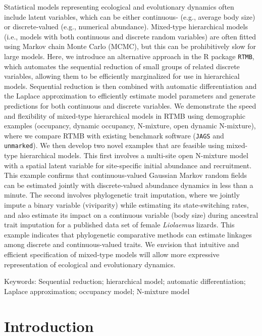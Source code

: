 \documentclass[11pt]{article}
\begin{document}
Statistical models representing ecological and evolutionary dynamics often include latent variables, which can be either continuous- (e.g., average body size) or discrete-valued (e.g., numerical abundance).  Mixed-type hierarchical models (i.e., models with both continuous and discrete random variables) are often fitted using Markov chain Monte Carlo (MCMC), but this can be prohibitively slow for large models.  Here, we introduce an alternative approach in the R package \texttt{RTMB}, which automates the sequential reduction of small groups of related discrete variables, allowing them to be efficiently marginalized for use in hierarchical models. Sequential reduction is then combined with automatic differentiation and the Laplace approximation to efficiently estimate model parameters and generate predictions for both continuous and discrete variables. We demonstrate the speed and flexibility of mixed-type hierarchical models in RTMB using demographic examples (occupancy, dynamic occupancy, N-mixture, open dynamic N-mixture), where we compare RTMB with existing  benchmark software (\texttt{JAGS} and \texttt{unmarked}).  We then develop two novel examples that are feasible using mixed-type hierarchical models.  This first involves a multi-site open N-mixture model with a spatial latent variable for site-specific initial abundance and recruitment.  This example confirms that continuous-valued Gaussian Markov random fields can be estimated jointly with discrete-valued abundance dynamics in less than a minute.  The second involves phylogenetic trait imputation, where we jointly impute a binary variable (viviparity) while estimating its state-switching rates, and also estimate its impact on a continuous variable (body size) during ancestral trait imputation for a published data set of female \textit{Liolaemus} lizards.  This example indicates that phylogenetic comparative methods can estimate linkages among discrete and continuous-valued traits.  We envision that intuitive and efficient specification of mixed-type models will allow more expressive representation of ecological and evolutionary dynamics.


\vspace*{\fill}
\noindent
Keywords: Sequential reduction; hierarchical model; automatic differentiation; Laplace approximation; occupancy model; N-mixture model

\clearpage

\section{Introduction}
\end{document}

